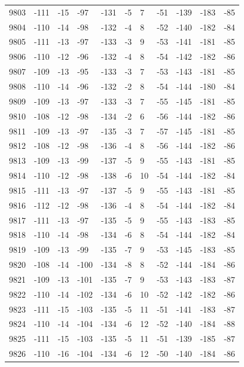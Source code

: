 \begin{table}[H]
\begin{tabular}{lllllllllll}
9803 & -111 & -15 & -97 & -131 & -5 & 7 & -51 & -139 & -183 & -85 \\
9804 & -110 & -14 & -98 & -132 & -4 & 8 & -52 & -140 & -182 & -84 \\
9805 & -111 & -13 & -97 & -133 & -3 & 9 & -53 & -141 & -181 & -85 \\
9806 & -110 & -12 & -96 & -132 & -4 & 8 & -54 & -142 & -182 & -86 \\
9807 & -109 & -13 & -95 & -133 & -3 & 7 & -53 & -143 & -181 & -85 \\
9808 & -110 & -14 & -96 & -132 & -2 & 8 & -54 & -144 & -180 & -84 \\
9809 & -109 & -13 & -97 & -133 & -3 & 7 & -55 & -145 & -181 & -85 \\
9810 & -108 & -12 & -98 & -134 & -2 & 6 & -56 & -144 & -182 & -86 \\
9811 & -109 & -13 & -97 & -135 & -3 & 7 & -57 & -145 & -181 & -85 \\
9812 & -108 & -12 & -98 & -136 & -4 & 8 & -56 & -144 & -182 & -86 \\
9813 & -109 & -13 & -99 & -137 & -5 & 9 & -55 & -143 & -181 & -85 \\
9814 & -110 & -12 & -98 & -138 & -6 & 10 & -54 & -144 & -182 & -84 \\
9815 & -111 & -13 & -97 & -137 & -5 & 9 & -55 & -143 & -181 & -85 \\
9816 & -112 & -12 & -98 & -136 & -4 & 8 & -54 & -144 & -182 & -84 \\
9817 & -111 & -13 & -97 & -135 & -5 & 9 & -55 & -143 & -183 & -85 \\
9818 & -110 & -14 & -98 & -134 & -6 & 8 & -54 & -144 & -182 & -84 \\
9819 & -109 & -13 & -99 & -135 & -7 & 9 & -53 & -145 & -183 & -85 \\
9820 & -108 & -14 & -100 & -134 & -8 & 8 & -52 & -144 & -184 & -86 \\
9821 & -109 & -13 & -101 & -135 & -7 & 9 & -53 & -143 & -183 & -87 \\
9822 & -110 & -14 & -102 & -134 & -6 & 10 & -52 & -142 & -182 & -86 \\
9823 & -111 & -15 & -103 & -135 & -5 & 11 & -51 & -141 & -183 & -87 \\
9824 & -110 & -14 & -104 & -134 & -6 & 12 & -52 & -140 & -184 & -88 \\
9825 & -111 & -15 & -103 & -135 & -5 & 11 & -51 & -139 & -185 & -87 \\
9826 & -110 & -16 & -104 & -134 & -6 & 12 & -50 & -140 & -184 & -86 \\

\end{tabular}
\end{table}

